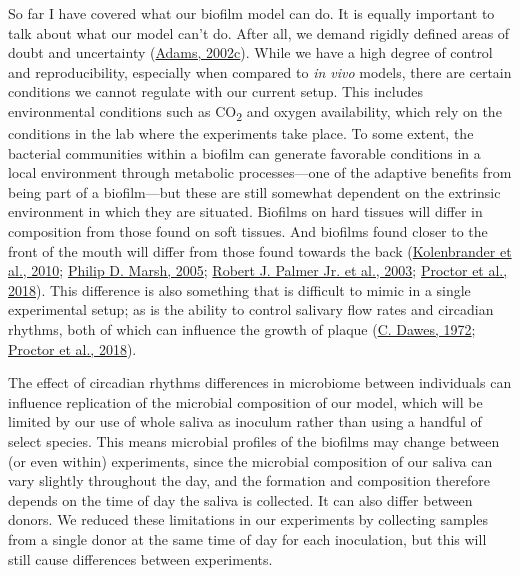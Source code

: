 \documentclass[
  letterpaper,
]{book}
\begin{document}
So far I have covered what our biofilm model can do. It is equally
important to talk about what our model can't do. After all, we demand
rigidly defined areas of doubt and uncertainty
(\protect\hyperlink{ref-adamsHitchhikersGuide2002}{Adams, 2002c}). While
we have a high degree of control and reproducibility, especially when
compared to \emph{in vivo} models, there are certain conditions we
cannot regulate with our current setup. This includes environmental
conditions such as CO\textsubscript{2} and oxygen availability, which
rely on the conditions in the lab where the experiments take place. To
some extent, the bacterial communities within a biofilm can generate
favorable conditions in a local environment through metabolic
processes---one of the adaptive benefits from being part of a
biofilm---but these are still somewhat dependent on the extrinsic
environment in which they are situated. Biofilms on hard tissues will
differ in composition from those found on soft tissues. And biofilms
found closer to the front of the mouth will differ from those found
towards the back
(\protect\hyperlink{ref-kolenbranderOralMultispecies2010}{Kolenbrander
et al., 2010}; \protect\hyperlink{ref-marshDentalPlaque2005}{Philip D.
Marsh, 2005};
\protect\hyperlink{ref-palmerCoaggregationInteractions2003}{Robert J.
Palmer Jr. et al., 2003};
\protect\hyperlink{ref-proctorSpatialGradient2018}{Proctor et al.,
2018}). This difference is also something that is difficult to mimic in
a single experimental setup; as is the ability to control salivary flow
rates and circadian rhythms, both of which can influence the growth of
plaque (\protect\hyperlink{ref-dawesCircadianRhythms1972}{C. Dawes,
1972}; \protect\hyperlink{ref-proctorSpatialGradient2018}{Proctor et
al., 2018}).

The effect of circadian rhythms differences in microbiome between
individuals can influence replication of the microbial composition of
our model, which will be limited by our use of whole saliva as inoculum
rather than using a handful of select species. This means microbial
profiles of the biofilms may change between (or even within)
experiments, since the microbial composition of our saliva can vary
slightly throughout the day, and the formation and composition therefore
depends on the time of day the saliva is collected. It can also differ
between donors. We reduced these limitations in our experiments by
collecting samples from a single donor at the same time of day for each
inoculation, but this will still cause differences between experiments.
\end{document}
